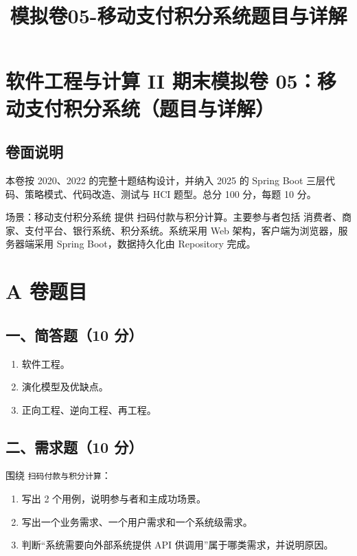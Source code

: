 \documentclass[UTF8,zihao=-4]{ctexart}
\title{模拟卷05-移动支付积分系统题目与详解}
\author{}
\date{}
\begin{document}
\maketitle
\setcounter{tocdepth}{1}
\tableofcontents
\newpage
\section{软件工程与计算 II 期末模拟卷 05：移动支付积分系统（题目与详解）}


\subsection{卷面说明}


本卷按 2020、2022 的完整十题结构设计，并纳入 2025 的 Spring Boot 三层代码、策略模式、代码改造、测试与 HCI 题型。总分 100 分，每题 10 分。


场景：移动支付积分系统 提供 扫码付款与积分计算。主要参与者包括 消费者、商家、支付平台、银行系统、积分系统。系统采用 Web 架构，客户端为浏览器，服务器端采用 Spring Boot，数据持久化由 Repository 完成。


\section{A 卷题目}


\subsection{一、简答题（10 分）}


\begin{enumerate}
\item 软件工程。
\item 演化模型及优缺点。
\item 正向工程、逆向工程、再工程。
\end{enumerate}


\subsection{二、需求题（10 分）}


围绕 \texttt{扫码付款与积分计算}：


\begin{enumerate}
\item 写出 2 个用例，说明参与者和主成功场景。
\item 写出一个业务需求、一个用户需求和一个系统级需求。
\item 判断“系统需要向外部系统提供 API 供调用”属于哪类需求，并说明原因。
\end{enumerate}
\end{document}
